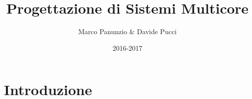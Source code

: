 

\title{Progettazione di Sistemi Multicore}
\author{Marco Panunzio \& Davide Pucci}
\date{2016-2017}


	
\maketitle
	
\tableofcontents

\chapter{Introduzione}


